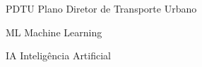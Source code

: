 \begin{siglas}
  \item[PDTU] Plano Diretor de Transporte Urbano
  \item[ML] Machine Learning
  \item[IA] Inteligência Artificial
\end{siglas}